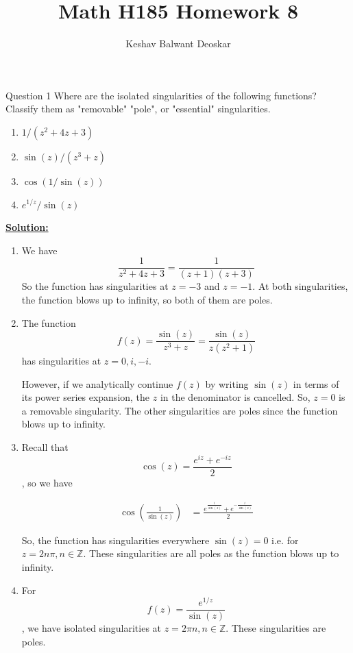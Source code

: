 \documentclass{article}
\title{Math H185 Homework 8}
\author{Keshav Balwant Deoskar}
\begin{document}
\maketitle



\begin{mathdefinitionbox}{Question 1}
\vskip 0.5cm
Where are the isolated singularities of the following functions? Classify them as "removable" "pole", or "essential" singularities.
\begin{enumerate}[label=(\alph*)]
  \item $1/(z^2 + 4z + 3)$
  \item $\sin(z) / (z^3 + z)$
  \item $\cos(1/\sin(z))$
  \item $e^{1/z} / \sin(z) $
\end{enumerate}
\end{mathdefinitionbox}

\vskip 0.5cm
\underline{\textbf{Solution:}}

\begin{enumerate}[label=(\alph*)]
  \item We have 
  \[  \frac{1}{z^2 + 4z + 3} = \frac{1}{(z+1)(z+3)}  \] So the function has singularities at $z = - 3$ and $z = -1$. At both singularities, the function blows up to infinity, so both of them are poles.

  \item The function 
  \[ f(z) = \frac{\sin(z)}{z^3 + z} = \frac{\sin(z)}{z (z^2 + 1)}  \] has singularities at $z = 0, i, -i$. 

  However, if we analytically continue $f(z)$ by writing $\sin(z)$ in terms of its power series expansion, the $z$ in the denominator is cancelled. So, $z = 0$ is a removable singularity. The other singularities are poles since the function blows up to infinity.

  \item Recall that \[ \cos(z) = \frac{e^{iz} + e^{-iz}}{2} \], so we have 
  
  \begin{align*}
    \cos \left(\frac{1}{\sin(z)} \right) &= \frac{e^{\frac{i}{\sin(z)}} + e^{-\frac{i}{\sin(z)}}}{2}
  \end{align*}

  So, the function has singularities everywhere $\sin(z) = 0$ i.e. for $z = 2n \pi, n \in \mathbb{Z}$. These singularities are all poles as the function blows up to infinity.

  \item For \[ f(z) = \frac{e^{1/z}}{\sin(z)} \], we have isolated singularities at $z = 2\pi n, n \in \mathbb{Z}$. These singularities are poles.
\end{enumerate}
\end{document}
